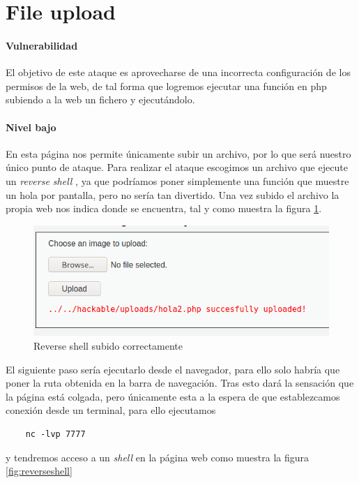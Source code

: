 \section{File upload}
\paragraph{Vulnerabilidad} El objetivo de este ataque es aprovecharse de una incorrecta
configuración de los permisos de la web, de tal forma que logremos ejecutar una función 
en php subiendo a la web un fichero y ejecutándolo.
\paragraph{Nivel bajo} En esta página nos permite únicamente subir un archivo, por lo que será nuestro único
punto de ataque. Para realizar el ataque escogimos un archivo que ejecute un {\it reverse shell} \cite{reverseshell}, ya que podríamos
poner simplemente una función que muestre un hola por pantalla, pero no sería tan divertido. 
Una vez subido el archivo la propia web nos indica donde se encuentra, tal y como muestra la figura \ref{fig:upload}.
\begin{figure}[ht!]
    \centering
    \includegraphics[width=14cm]{img/upload/succes.png}
    \caption{Reverse shell subido correctamente}
    \label{fig:upload}
\end{figure}
El siguiente paso sería ejecutarlo desde el navegador, para ello solo habría que poner 
la ruta obtenida en la barra de navegación. Tras esto dará la sensación que la página está colgada, pero únicamente esta a la espera 
de que establezcamos conexión desde un terminal, para ello ejecutamos
\begin{lstlisting}
    nc -lvp 7777
\end{lstlisting} 
y tendremos acceso a un {\it shell} en la página web como muestra la figura \ref{fig:reverseshell}
